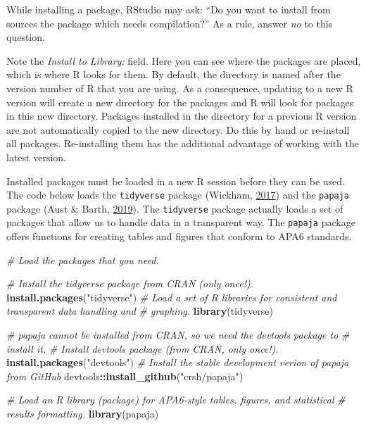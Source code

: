 \documentclass[doc,floatsintext]{apa6}
\newenvironment{Shaded}{\begin{snugshade}}{\end{snugshade}}
\newcommand{\KeywordTok}[1]{\textcolor[rgb]{0.13,0.29,0.53}{\textbf{#1}}}
\newcommand{\StringTok}[1]{\textcolor[rgb]{0.31,0.60,0.02}{#1}}
\newcommand{\CommentTok}[1]{\textcolor[rgb]{0.56,0.35,0.01}{\textit{#1}}}
\newcommand{\OperatorTok}[1]{\textcolor[rgb]{0.81,0.36,0.00}{\textbf{#1}}}
\newcommand{\NormalTok}[1]{#1}
\begin{document}
While installing a package, RStudio may ask: \enquote{Do you want to
install from sources the package which needs compilation?} As a rule,
answer \emph{no} to this question.

Note the \emph{Install to Library:} field. Here you can see where the
packages are placed, which is where R looks for them. By default, the
directory is named after the version number of R that you are using. As
a consequence, updating to a new R version will create a new directory
for the packages and R will look for packages in this new directory.
Packages installed in the directory for a previous R version are not
automatically copied to the new directory. Do this by hand or re-install
all packages. Re-installing them has the additional advantage of working
with the latest version.

Installed packages must be loaded in a new R session before they can be
used. The code below loads the \texttt{tidyverse} package (Wickham,
\protect\hyperlink{ref-R-tidyverse}{2017}) and the \texttt{papaja}
package (Aust \& Barth, \protect\hyperlink{ref-R-papaja}{2019}). The
\texttt{tidyverse} package actually loads a set of packages that allow
us to handle data in a transparent way. The \texttt{papaja} package
offers functions for creating tables and figures that conform to APA6
standards.

\begin{Shaded}
\begin{Highlighting}[]
\CommentTok{# Load the packages that you need.}

\CommentTok{# Install the tidyverse package from CRAN (only once!).}
\KeywordTok{install.packages}\NormalTok{(}\StringTok{"tidyverse"}\NormalTok{)}
\CommentTok{# Load a set of R libraries for consistent and transparent data handling and}
\CommentTok{# graphing.}
\KeywordTok{library}\NormalTok{(tidyverse) }

\CommentTok{# papaja cannot be installed from CRAN, so we need the devtools package to}
\CommentTok{# install it.}
\CommentTok{# Install devtools package (from CRAN, only once!).}
\KeywordTok{install.packages}\NormalTok{(}\StringTok{"devtools"}\NormalTok{)}
\CommentTok{# Install the stable development verion of papaja from GitHub}
\NormalTok{devtools}\OperatorTok{::}\KeywordTok{install_github}\NormalTok{(}\StringTok{"crsh/papaja"}\NormalTok{)}

\CommentTok{# Load an R library (package) for APA6-style tables, figures, and statistical}
\CommentTok{# results formatting.}
\KeywordTok{library}\NormalTok{(papaja) }
\end{Highlighting}
\end{Shaded}
\end{document}
